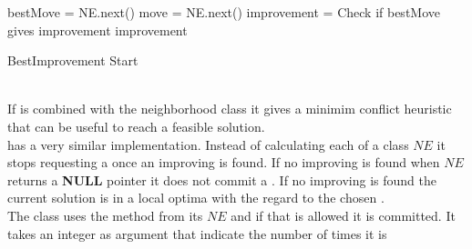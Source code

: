 \IncMargin{1em}
\begin{algorithm}[H]

\algdata
{}
\BlankLine
 bestMove = NE.next() \;
 move = NE.next() \;
\bool improvement = Check if bestMove gives improvement \;
 \;
\Return improvement \;

\caption{BestImprovement Start} \label{algo_BI} 
\end{algorithm} \noindent
\DecMargin{1em} \\
If  is combined with the neighborhood class  it gives a minimim 
conflict heuristic that can be useful to reach a feasible solution. \\ 
 has a very similar implementation. Instead of calculating each  of a 
 class $NE$ it stops requesting a  once an improving  is found. If no 
improving  is found when $NE$ returns a \textbf{NULL} pointer it does not commit a . If no 
improving  is found the current solution is in a local optima with the regard to the chosen 
. \\ 
The class  uses the method  from its  $NE$ and if that 
 is allowed it is committed. It takes an integer as argument that indicate the number of times it is 
